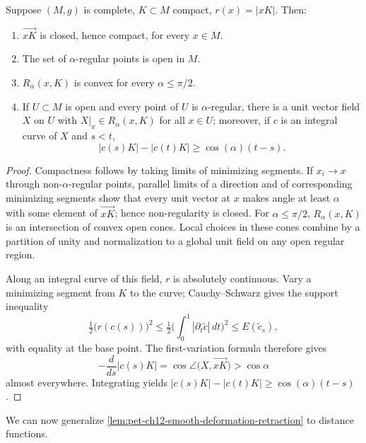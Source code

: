 \begin{proposition}
  \label{prop:pet-ch12-regular-point-properties}
  Suppose $(M,g)$ is complete, $K\subset M$ compact, $r(x)=|xK|$. Then:
  \begin{enumerate}
    \item $\overrightarrow{xK}$ is closed, hence compact, for every $x\in M$.
    \item The set of $\alpha$-regular points is open in $M$.
    \item $R_\alpha(x,K)$ is convex for every $\alpha\le\pi/2$.
    \item If $U\subset M$ is open and every point of $U$ is $\alpha$-regular,
      there is a unit vector field $X$ on $U$ with $X|_x\in R_\alpha(x,K)$ for
      all $x\in U$; moreover, if $c$ is an integral curve of $X$ and $s<t$,
      \[
        |c(s)K|-|c(t)K|\ge\cos(\alpha)(t-s).
      \]
  \end{enumerate}
\end{proposition}
\begin{proof}
  \sketch
  Compactness follows by taking limits of minimizing segments. If
  $x_i\to x$ through non-$\alpha$-regular points, parallel limits of a
  direction and of corresponding minimizing segments show that every unit
  vector at $x$ makes angle at least $\alpha$ with some element of
  $\overrightarrow{xK}$; hence non-regularity is closed. For
  $\alpha\le\pi/2$, $R_\alpha(x,K)$ is an intersection of convex open cones.
  Local choices in these cones combine by a partition of unity and
  normalization to a global unit field on any open regular region.

  Along an integral curve of this field, $r$ is absolutely continuous. Vary a
  minimizing segment from $K$ to the curve; Cauchy--Schwarz gives the support
  inequality
  \[
    \tfrac12\big(r(c(s))\big)^2
    \le\tfrac12\Big(\int_0^1|\partial_t\tilde c|\,dt\Big)^2
    \le E(\tilde c_s),
  \]
  with equality at the base point. The first-variation formula therefore gives
  \[
    -\frac{d}{ds}|c(s)K|=
    \cos\angle\bigl(X,\overrightarrow{xK}\bigr)>\cos\alpha
  \]
  almost everywhere. Integrating yields
  $|c(s)K|-|c(t)K|\ge\cos(\alpha)(t-s)$.
\end{proof}

We can now generalize \cref{lem:pet-ch12-smooth-deformation-retraction} to
distance functions.

